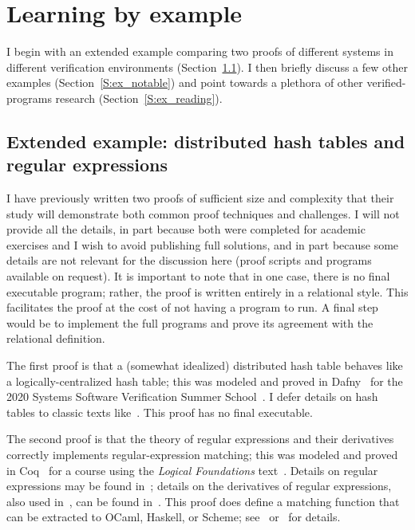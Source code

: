 \section{Learning by example}\label{S:examples}


I begin with an extended example comparing two proofs of different systems in
different verification environments (Section~\ref{S:ex_ext}). I then briefly
discuss a few other examples (Section~\ref{S:ex_notable}) and point towards a
plethora of other verified-programs research (Section~\ref{S:ex_reading}).

\subsection{Extended example: distributed hash tables and regular
expressions}\label{S:ex_ext}

I have previously written two proofs of sufficient size and complexity that
their study will demonstrate both common proof techniques and challenges. I will
not provide all the details, in part because both were completed for academic
exercises and I wish to avoid publishing full solutions, and in part because
some details are not relevant for the discussion here (proof scripts and
programs available on request). It is important to note that in one case, there
is no final executable program; rather, the proof is written entirely in a
relational style. This facilitates the proof at the cost of not having a program
to run. A final step would be to implement the full programs and prove its
agreement with the relational definition.

The first proof is that a (somewhat idealized) distributed hash table behaves
like a logically-centralized hash table; this was modeled and proved in
Dafny~\cite{leino2010dafny} for the 2020 Systems Software Verification Summer
School~\cite{Kapritsos_2020}. I defer details on hash tables to classic texts
like~\cite{CLRS}. This proof has no final executable.

The second proof is that the theory of regular expressions and their derivatives
correctly implements regular-expression matching; this was modeled and proved in
Coq~\cite{Coq} for a course using the \emph{Logical Foundations}
text~\cite{Pierce:SF1}. Details on regular expressions may be found
in~\cite{Lewis_1997,Morrisett_2012}; details on the derivatives of regular
expressions, also used in~\cite{Pierce:SF1,Morrisett_2012}, can be found
in~\cite{Might_Yacc,Might_desugar,Might_deriv}. This proof does define a
matching function that can be extracted to OCaml, Haskell, or Scheme;
see~\cite{Coq_Extract} or~\cite[Extraction]{Pierce:SF1} for details.

